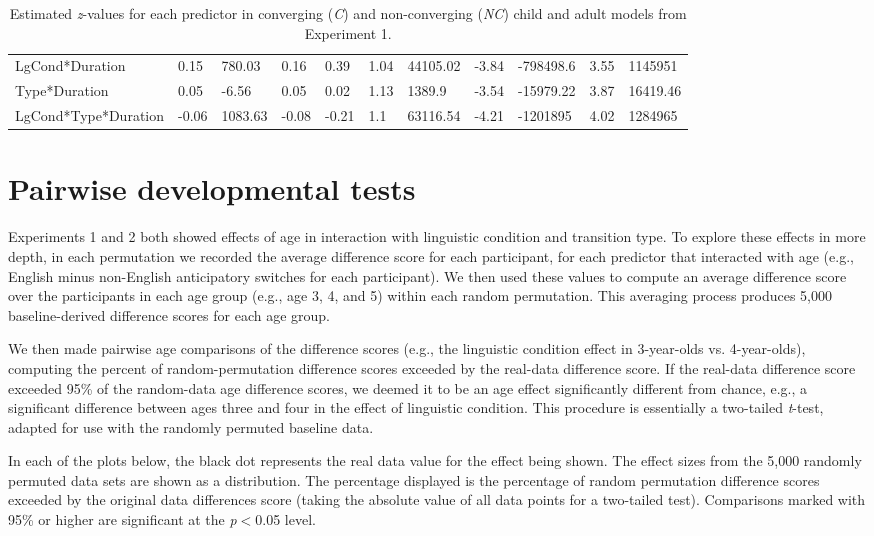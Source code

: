 \documentclass[authoryear, 12pt]{elsarticle}
\begin{document}
\begin{table}
\begin{scriptsize}
\begin{tabular}{lllllllllll}
    LgCond*Duration			& 0.15	& 780.03	& 0.16	& 0.39	& 1.04	& 44105.02	& -3.84	& -798498.6	& 3.55	& 1145951	\\
    Type*Duration 				& 0.05	& -6.56		& 0.05	& 0.02	& 1.13	& 1389.9	& -3.54	& -15979.22	& 3.87	& 16419.46	\\
    LgCond*Type*Duration	& -0.06	& 1083.63	& -0.08	& -0.21	& 1.1		& 63116.54	& -4.21	& -1201895		& 4.02	& 1284965	\\
    \hline
  \end{tabular}
  \caption{Estimated \textit{z}-values for each predictor in converging (\textit{C}) and non-converging (\textit{NC}) child and adult models from Experiment 1. }
\label{tab:nonconv_e1}
 \end{scriptsize}
\end{table}

\section{Pairwise developmental tests}
\label{sec:pairwisedev}
\setcounter{figure}{0}
Experiments 1 and 2 both showed effects of age in interaction with linguistic condition and transition type. To explore these effects in more depth, in each permutation we recorded the average difference score for each participant, for each predictor that interacted with age (e.g., English minus non-English anticipatory switches for each participant). We then used these values to compute an average difference score over the participants in each age group (e.g., age 3, 4, and 5) within each random permutation. This averaging process produces 5,000 baseline-derived difference scores for each age group.

We then made pairwise age comparisons of the difference scores (e.g., the linguistic condition effect in 3-year-olds vs. 4-year-olds), computing the percent of random-permutation difference scores exceeded by the real-data difference score. If the real-data difference score exceeded 95\% of the random-data age difference scores, we deemed it to be an age effect significantly different from chance, e.g., a significant difference between ages three and four in the effect of linguistic condition. This procedure is essentially a two-tailed \textit{t}-test, adapted for use with the randomly permuted baseline data.

In each of the plots below, the black dot represents the real data value for the effect being shown. The effect sizes from the 5,000 randomly permuted data sets are shown as a distribution. The percentage displayed is the percentage of random permutation difference scores exceeded by the original data differences score (taking the absolute value of all data points for a two-tailed test). Comparisons marked with 95\% or higher are significant at the \textit{p}$<$0.05 level.
\end{document}
